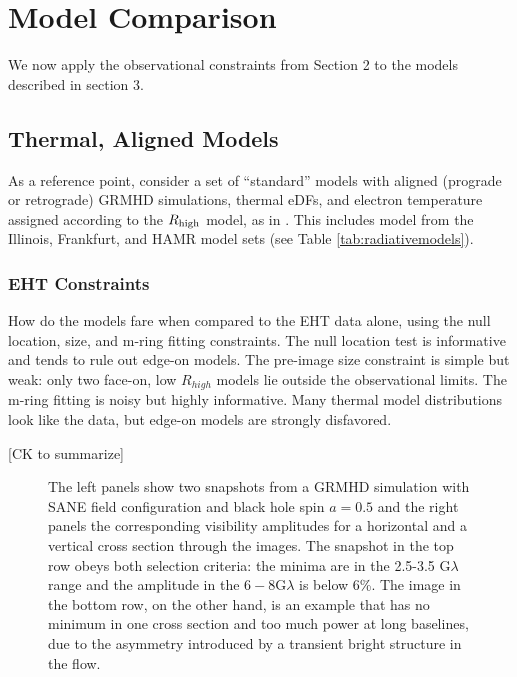\section{Model Comparison}\label{sec:comparisons}

We now apply the observational constraints from Section 2 to the models described in section 3. 

\subsection{Thermal, Aligned Models}

As a reference point, consider a set of ``standard'' models with aligned (prograde or retrograde) GRMHD simulations, thermal eDFs, and electron temperature assigned according to the $R_\mathrm{high}$ model, as in \cite{M87PaperV}.  This includes model from the Illinois, Frankfurt, and HAMR model sets (see Table \ref{tab:radiativemodels}).

\subsubsection{EHT Constraints}

How do the models fare when compared to the EHT data alone, using the null location, size, and m-ring fitting constraints.  The null location test is informative and tends to rule out edge-on models.  The pre-image size constraint is simple but weak: only two face-on, low $R_{high}$ models lie outside the observational limits.   The m-ring fitting is noisy but highly informative.  Many thermal model distributions look like the data, but edge-on models are strongly disfavored.


[CK to summarize]


\begin{figure}
  \centering
  [altex]
  \caption{The left panels show two snapshots from a GRMHD simulation
    with SANE field configuration and black hole spin $a=0.5$ and the
    right panels the corresponding visibility amplitudes for a
    horizontal and a vertical cross section through the images.
    The snapshot in the top row obeys both selection criteria: the
    minima are in the 2.5-3.5 G$\lambda$ range and the amplitude in
    the $6-8$G$\lambda$ is below 6\%.
    The image in the bottom row, on the other hand, is an example that
    has no minimum in one cross section and too much power at long
    baselines, due to the asymmetry introduced by a transient bright
    structure in the flow.}
  \label{fig:cmp_VA}
\end{figure}


